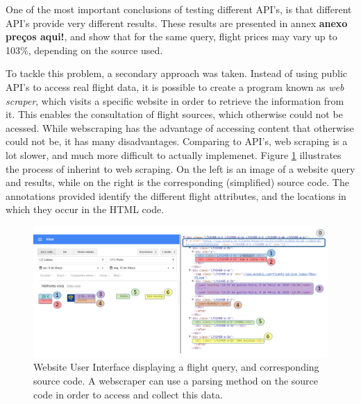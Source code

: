 One of the most important conclusions of testing different API's,
is that different API's provide very different results.
These results are presented in annex \textbf{anexo preços aqui!},
and show that for the same query,
flight prices may vary up to 103\%, depending on the source used.

To tackle this problem, a secondary approach was taken. Instead of using 
public API's to access real flight data, it is possible to create a program known as \textit{web scraper},
which visits a specific website in order to retrieve the information from it.
This enables the consultation of flight sources, which otherwise could not be acessed.
While webscraping has the advantage of accessing content that otherwise could not be,
it has many disadvantages. Comparing to API's,
web scraping is a lot slower, and much more difficult to actually implemenet.
Figure \ref{fig:scraping_example} illustrates the process of inherint to web scraping.
On the left is an image of a website query and results,
while on the right is the corresponding (simplified) source code.
The annotations provided identify the different flight attributes, and the locations in which they occur in the HTML code.
 
\begin{figure}[htpb]
  \centering
  \includegraphics[width=\textwidth]{./Figures/system_design/gflights_simplified_marked.png}
  \caption{Website User Interface displaying a flight query, and corresponding source code.
  A webscraper can use a parsing method on the source code in order to access and collect this data. }
  \label{fig:scraping_example}  
\end{figure}













